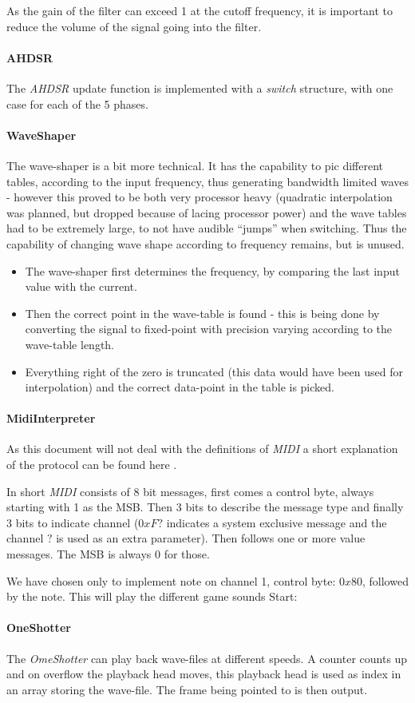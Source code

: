 As the gain of the filter can exceed 1 at the cutoff frequency, it is important
to reduce the volume of the signal going into the filter.

\paragraph{AHDSR}
The \emph{AHDSR} update function is implemented with a \emph{switch}
structure, with one case for each of the 5 phases.

\paragraph{WaveShaper}
The wave-shaper is a bit more technical.
It has the capability to pic different tables, according to the input
frequency, thus generating bandwidth limited waves - however this proved to be
both very processor heavy (quadratic interpolation was planned, but dropped
because of lacing processor power) and the wave tables had to be extremely
large, to not have audible ``jumps'' when switching.
Thus the capability of changing wave shape according to frequency remains, but is
unused.

\begin{itemize}
  \item The wave-shaper first determines the frequency, by comparing the last
  input value with the current.
  \item Then the correct point in the wave-table is found - this is being done
  by converting the signal to fixed-point with precision varying according to
  the wave-table length.
  \item Everything right of the zero is truncated (this data
  would have been used for interpolation) and the correct data-point in the
  table is picked.
\end{itemize}

\paragraph{MidiInterpreter}
As this document will not deal with the definitions of \emph{MIDI} a short
explanation of the protocol can be found here \cite{MIDI}.

In short \emph{MIDI} consists of 8 bit messages, first comes a control byte,
always starting with 1 as the MSB. Then 3 bits to describe the message type and
finally 3 bits to indicate channel ($0xF?$ indicates a system exclusive message
and the channel $?$ is used as an extra parameter). Then follows one or more
value messages. The MSB is always 0 for those.

We have chosen only to implement note on channel 1, control byte: $0x80$,
followed by the note. This will play the different game sounds
Start:

\paragraph{OneShotter}
The \emph{OmeShotter} can play back wave-files at different speeds. A counter
counts up and on overflow the playback head moves, this playback head is used as
index in an array storing the wave-file. The frame being pointed to is then
output.

